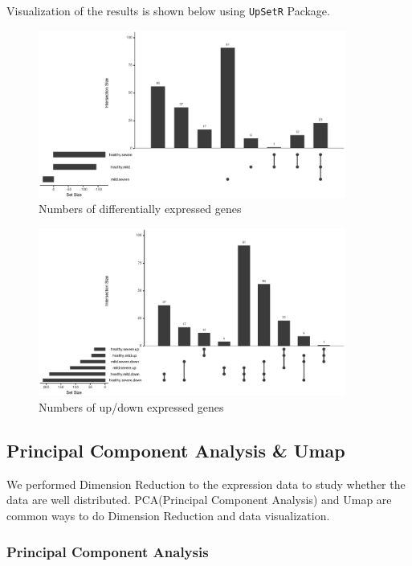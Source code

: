 \documentclass[en,black,12pt,normal]{elegantnote}
\begin{document}
Visualization of the results is shown below using \lstinline{UpSetR} Package.
\begin{figure}[H]
    \centering
    \includegraphics[width=0.9\textwidth]{image/USET.eps}
    \caption{Numbers of differentially expressed genes}
    \label{PValue}
\end{figure}

\begin{figure}[H]
    \centering
    \includegraphics[width=0.9\textwidth]{image/USET2.eps}
    \caption{Numbers of up/down expressed genes}
    \label{PValue}
\end{figure}


\subsection{Principal Component Analysis \& Umap}
We performed Dimension Reduction to the expression data to study whether the data are well distributed. PCA(Principal Component Analysis) and Umap are common ways to do Dimension Reduction and data visualization.

\subsubsection{Principal Component Analysis}
\end{document}
